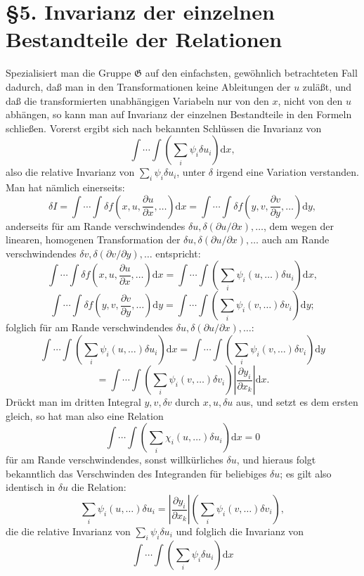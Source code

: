 \documentclass[11pt]{article}
\providecommand{\dd}{\mathrm d}
\providecommand{\G}{\mathfrak G}
\providecommand{\p}{\partial}
\providecommand{\p}{\partial}
\providecommand{\dd}{\mathrm d}
\begin{document}
\section*{\S{}5. Invarianz der einzelnen Bestandteile der Relationen}

Spezialisiert man die Gruppe \(\G\) auf den einfachsten, gewöhnlich betrachteten Fall dadurch, daß man in den Transformationen keine Ableitungen der \(u\) zuläßt, und daß die transformierten unabhängigen Variabeln nur von den \(x\), nicht von den \(u\) abhängen, so kann man auf Invarianz der einzelnen Bestandteile in den Formeln schließen. Vorerst ergibt sich nach bekannten Schlüssen die Invarianz von
\[
\int\!\cdots\!\int\left(\sum_i\psi_i\delta u_i\right)\dd x,
\]
also die relative Invarianz von \(\sum_i\psi_i\delta u_i\), unter \(\delta\) irgend eine Variation verstanden. Man hat nämlich einerseits:
\[
\delta I
=\int\!\cdots\!\int \delta f\!\left(x,u,\frac{\p u}{\p x},\ldots\right)\dd x
=\int\!\cdots\!\int \delta f\!\left(y,v,\frac{\p v}{\p y},\ldots\right)\dd y,
\]
anderseits für am Rande verschwindendes \(\delta u,\delta(\p u/\p x),\ldots\), dem wegen der linearen, homogenen Transformation der \(\delta u,\delta(\p u/\p x),\ldots\) auch am Rande verschwindendes \(\delta v,\delta(\p v/\p y),\ldots\) entspricht:
\[
\int\!\cdots\!\int \delta f\!\left(x,u,\frac{\p u}{\p x},\ldots\right)\dd x
=
\int\!\cdots\!\int\left(\sum_i\psi_i(u,\ldots)\delta u_i\right)\dd x,
\]
\[
\int\!\cdots\!\int \delta f\!\left(y,v,\frac{\p v}{\p y},\ldots\right)\dd y
=
\int\!\cdots\!\int\left(\sum_i\psi_i(v,\ldots)\delta v_i\right)\dd y;
\]
folglich für am Rande verschwindendes \(\delta u,\delta(\p u/\p x),\ldots\):
\[
\int\!\cdots\!\int\left(\sum_i\psi_i(u,\ldots)\delta u_i\right)\dd x
=
\int\!\cdots\!\int\left(\sum_i\psi_i(v,\ldots)\delta v_i\right)\dd y
\]
\[
=
\int\!\cdots\!\int\left(\sum_i\psi_i(v,\ldots)\delta v_i\right)
\left|\frac{\p y_i}{\p x_k}\right|\dd x.
\]
Drückt man im dritten Integral \(y,v,\delta v\) durch \(x,u,\delta u\) aus, und setzt es dem ersten gleich, so hat man also eine Relation
\[
\int\!\cdots\!\int\left(\sum_i\chi_i(u,\ldots)\delta u_i\right)\dd x=0
\]
für am Rande verschwindendes, sonst willkürliches \(\delta u\), und hieraus folgt bekanntlich das Verschwinden des Integranden für beliebiges \(\delta u\); es gilt also identisch in \(\delta u\) die Relation:
\[
\sum_i\psi_i(u,\ldots)\delta u_i
=
\left|\frac{\p y_i}{\p x_k}\right|
\left(\sum_i\psi_i(v,\ldots)\delta v_i\right),
\]
die die relative Invarianz von \(\sum_i\psi_i\delta u_i\) und folglich die Invarianz von
\[
\int\!\cdots\!\int\left(\sum_i\psi_i\delta u_i\right)\dd x
\]
\end{document}
